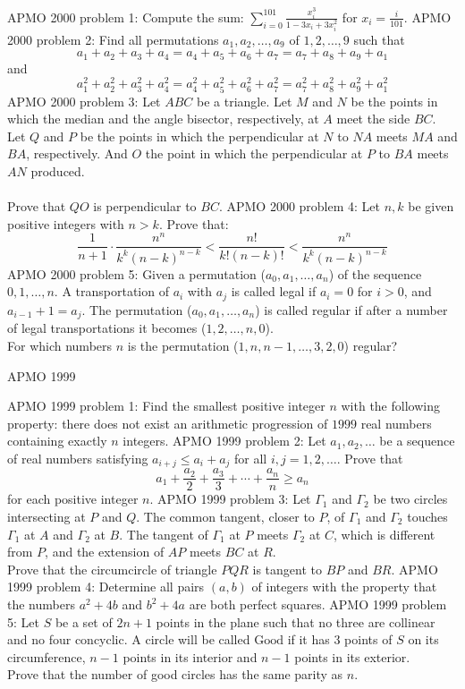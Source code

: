APMO 2000 problem 1:  Compute the sum: $\sum_{i=0}^{101} \frac{x_i^3}{1-3x_i+3x_i^2}$ for $x_i=\frac{i}{101}$. 
APMO 2000 problem 2:  Find all permutations $a_1, a_2, \ldots, a_9$ of $1, 2, \ldots, 9$ such that
\[ a_1+a_2+a_3+a_4=a_4+a_5+a_6+a_7= a_7+a_8+a_9+a_1 \]
and
\[ a_1^2+a_2^2+a_3^2+a_4^2=a_4^2+a_5^2+a_6^2+a_7^2= a_7^2+a_8^2+a_9^2+a_1^2 \] 
APMO 2000 problem 3:  Let $ABC$ be a triangle. Let $M$ and $N$ be the points in which the median and the angle bisector, respectively, at $A$ meet the side $BC$. Let $Q$ and $P$ be the points in which the perpendicular at $N$ to $NA$ meets $MA$ and $BA$, respectively. And $O$ the point in which the perpendicular at $P$ to $BA$ meets $AN$ produced. \\\\
Prove that $QO$ is perpendicular to $BC$. 
APMO 2000 problem 4:  Let $n,k$ be given positive integers with $n>k$. Prove that:
\[
\frac{1}{n+1} \cdot \frac{n^n}{k^k (n-k)^{n-k}} < \frac{n!}{k! (n-k)!} < \frac{n^n}{k^k(n-k)^{n-k}}
\] 
APMO 2000 problem 5:  Given a permutation ($a_0, a_1, \ldots, a_n$) of the sequence $0, 1,\ldots, n$. A transportation of $a_i$ with $a_j$ is called legal if $a_i=0$ for $i>0$, and $a_{i-1}+1=a_j$. The permutation ($a_0, a_1, \ldots, a_n$) is called regular if after a number of legal transportations it becomes ($1,2, \ldots, n,0$). \\
For which numbers $n$ is the permutation ($1, n, n-1, \ldots, 3, 2, 0$) regular? 

APMO 1999 

APMO 1999 problem 1:  Find the smallest positive integer $n$ with the following property: there does not exist an arithmetic progression of $1999$ real numbers containing exactly $n$ integers. 
APMO 1999 problem 2:  Let $a_1, a_2, \dots$ be a sequence of real numbers satisfying $a_{i+j} \leq a_i+a_j$ for all $i,j=1,2,\dots$. Prove that
\[ a_1 + \frac{a_2}{2} + \frac{a_3}{3} + \cdots + \frac{a_n}{n} \geq a_n \]
for each positive integer $n$. 
APMO 1999 problem 3:  Let $\Gamma_1$ and $\Gamma_2$ be two circles intersecting at $P$ and $Q$. The common tangent, closer to $P$, of $\Gamma_1$ and $\Gamma_2$ touches $\Gamma_1$ at $A$ and $\Gamma_2$ at $B$. The tangent of $\Gamma_1$ at $P$ meets $\Gamma_2$ at $C$, which is different from $P$, and the extension of $AP$ meets $BC$ at $R$. \\
Prove that the circumcircle of triangle $PQR$ is tangent to $BP$ and $BR$. 
APMO 1999 problem 4:  Determine all pairs $(a,b)$ of integers with the property that the numbers $a^2+4b$ and $b^2+4a$ are both perfect squares. 
APMO 1999 problem 5:  Let $S$ be a set of $2n+1$ points in the plane such that no three are collinear and no four concyclic. A circle will be called $\text{Good}$ if it has 3 points of $S$ on its circumference, $n-1$ points in its interior and $n-1$ points in its exterior. \\
Prove that the number of good circles has the same parity as $n$. 

